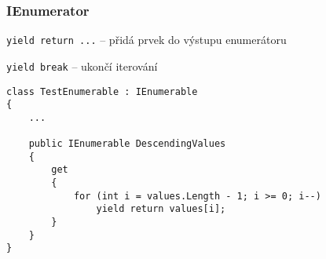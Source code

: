 \begin{frame}[fragile]
\frametitle{IEnumerator}
\vfill
\begin{bitemize}{}
\item \lstinline|yield return ...| -- přidá prvek do výstupu enumerátoru
\item \lstinline|yield break| -- ukončí iterování
\end{bitemize}
\vfill
\begin{yesblock}
\begin{lstlisting}
class TestEnumerable : IEnumerable
{
    ...
    
    public IEnumerable DescendingValues
    {
        get
        {
            for (int i = values.Length - 1; i >= 0; i--)
                yield return values[i];
        }
    }
}
\end{lstlisting}
\end{yesblock}
\vfill
\end{frame}